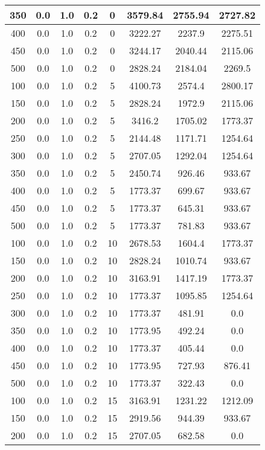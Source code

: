 \documentclass[a4paper, 12pt]{extreport}
\begin{document}
\begin{itemize}
\begin{longtable}{|c|c|c|c|c|c|c|c|}
			350 & 0.0 & 1.0 & 0.2 & 0 & 3579.84 & 2755.94 & 2727.82 \\\hline
			400 & 0.0 & 1.0 & 0.2 & 0 & 3222.27 & 2237.9 & 2275.51 \\\hline
			450 & 0.0 & 1.0 & 0.2 & 0 & 3244.17 & 2040.44 & 2115.06 \\\hline
			500 & 0.0 & 1.0 & 0.2 & 0 & 2828.24 & 2184.04 & 2269.5 \\\hline
			100 & 0.0 & 1.0 & 0.2 & 5 & 4100.73 & 2574.4 & 2800.17 \\\hline
			150 & 0.0 & 1.0 & 0.2 & 5 & 2828.24 & 1972.9 & 2115.06 \\\hline
			200 & 0.0 & 1.0 & 0.2 & 5 & 3416.2 & 1705.02 & 1773.37 \\\hline
			250 & 0.0 & 1.0 & 0.2 & 5 & 2144.48 & 1171.71 & 1254.64 \\\hline
			300 & 0.0 & 1.0 & 0.2 & 5 & 2707.05 & 1292.04 & 1254.64 \\\hline
			350 & 0.0 & 1.0 & 0.2 & 5 & 2450.74 & 926.46 & 933.67 \\\hline
			400 & 0.0 & 1.0 & 0.2 & 5 & 1773.37 & 699.67 & 933.67 \\\hline
			450 & 0.0 & 1.0 & 0.2 & 5 & 1773.37 & 645.31 & 933.67 \\\hline
			500 & 0.0 & 1.0 & 0.2 & 5 & 1773.37 & 781.83 & 933.67 \\\hline
			100 & 0.0 & 1.0 & 0.2 & 10 & 2678.53 & 1604.4 & 1773.37 \\\hline
			150 & 0.0 & 1.0 & 0.2 & 10 & 2828.24 & 1010.74 & 933.67 \\\hline
			200 & 0.0 & 1.0 & 0.2 & 10 & 3163.91 & 1417.19 & 1773.37 \\\hline
			250 & 0.0 & 1.0 & 0.2 & 10 & 1773.37 & 1095.85 & 1254.64 \\\hline
			300 & 0.0 & 1.0 & 0.2 & 10 & 1773.37 & 481.91 & 0.0 \\\hline
			350 & 0.0 & 1.0 & 0.2 & 10 & 1773.95 & 492.24 & 0.0 \\\hline
			400 & 0.0 & 1.0 & 0.2 & 10 & 1773.37 & 405.44 & 0.0 \\\hline
			450 & 0.0 & 1.0 & 0.2 & 10 & 1773.95 & 727.93 & 876.41 \\\hline
			500 & 0.0 & 1.0 & 0.2 & 10 & 1773.37 & 322.43 & 0.0 \\\hline
			100 & 0.0 & 1.0 & 0.2 & 15 & 3163.91 & 1231.22 & 1212.09 \\\hline
			150 & 0.0 & 1.0 & 0.2 & 15 & 2919.56 & 944.39 & 933.67 \\\hline
			200 & 0.0 & 1.0 & 0.2 & 15 & 2707.05 & 682.58 & 0.0 \\\hline

\end{longtable}
\end{itemize}
\end{document}
